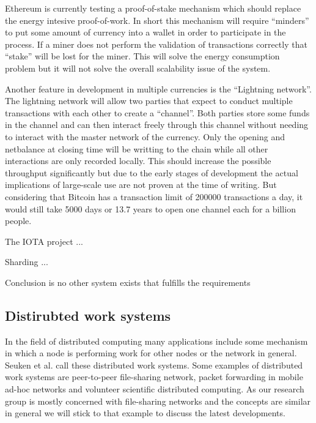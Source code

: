 Ethereum is currently testing a proof-of-stake mechanism which should replace the energy intesive 
proof-of-work. In short this mechanism will require ``minders'' to put some amount of currency into
a wallet in order to participate in the process. If a miner does not perform the validation of 
transactions correctly that ``stake'' will be lost for the miner. This will solve the energy 
consumption problem but it will not solve the overall scalability issue of the system. 

Another feature in development in multiple currencies is the ``Lightning network''. The lightning 
network will allow two parties that expect to conduct multiple transactions with each other to 
create a ``channel''. Both parties store some funds in the channel and can then interact freely 
through this channel without needing to interact with the master network of the currency. Only the
opening and netbalance at closing time will be writting to the chain while all other interactions 
are only recorded locally. This should increase the possible throughput significantly but due to the
early stages of development the actual implications of large-scale use are not proven at the time of
writing. But considering that Bitcoin has a transaction limit of 200000 transactions a day, it would 
still take 5000 days or 13.7 years to open one channel each for a billion people.

The IOTA project ...

Sharding ...

Conclusion is no other system exists that fulfills the requirements


\subsection{Distirubted work systems}
In the field of distributed computing many applications include some mechanism in which a node is
performing work for other nodes or the network in general. Seuken et al. call these distributed 
work systems. Some examples of distributed work systems are peer-to-peer file-sharing network,
packet forwarding in mobile ad-hoc networks and volunteer scientific distributed computing. As our 
research group is mostly concerned with file-sharing networks and the concepts are similar in 
general we will stick to that example to discuss the latest developments.

